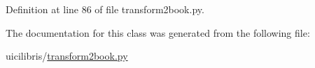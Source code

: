 \hypertarget{classuicilibris_1_1transform2book_1_1tableState_a0a770da97261193f514946fcdd4d038c}{
\subsubsection[{lines}]{}}\label{classuicilibris_1_1transform2book_1_1tableState_a0a770da97261193f514946fcdd4d038c}


\-Definition at line 86 of file transform2book.\-py.



\-The documentation for this class was generated from the following file\-:\begin{DoxyCompactItemize}
\item 
uicilibris/\hyperlink{transform2book_8py}{transform2book.\-py}\end{DoxyCompactItemize}
